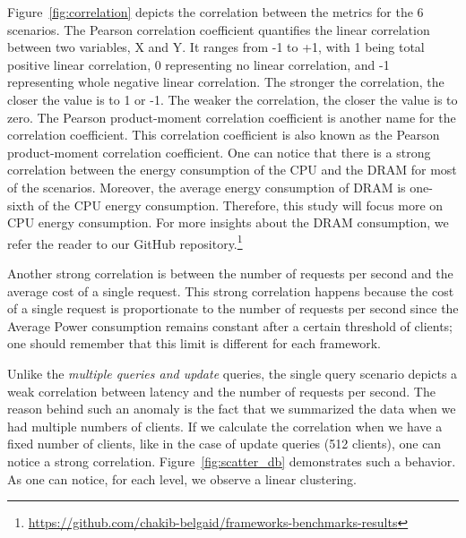 Figure~\ref{fig:correlation} depicts the correlation between the metrics for the 6 scenarios.
The Pearson correlation coefficient quantifies the linear correlation between two variables, X and Y.
It ranges from -1 to +1, with 1 being total positive linear correlation, 0 representing no linear correlation, and -1 representing whole negative linear correlation.
The stronger the correlation, the closer the value is to 1 or -1.
The weaker the correlation, the closer the value is to zero.
The Pearson product-moment correlation coefficient is another name for the correlation coefficient.
This correlation coefficient is also known as the Pearson product-moment correlation coefficient.
One can notice that there is a strong correlation between the energy consumption of the CPU and the DRAM for most of the scenarios.
Moreover, the average energy consumption of DRAM is one-sixth of the CPU energy consumption.
Therefore, this study will focus more on CPU energy consumption.
For more insights about the DRAM consumption, we refer the reader to our GitHub repository.\footnote{\url{https://github.com/chakib-belgaid/frameworks-benchmarks-results}}

Another strong correlation is between the number of requests per second and the average cost of a single request.
This strong correlation happens because the cost of a single request is proportionate to the number of requests per second since the Average Power consumption remains constant after a certain threshold of clients; one should remember that this limit is different for each framework.

Unlike the \emph{multiple queries and update} queries, the single query scenario depicts a weak correlation between latency and the number of requests per second.
The reason behind such an anomaly is the fact that we summarized the data when we had multiple numbers of clients.
If we calculate the correlation when we have a fixed number of clients, like in the case of update queries (512 clients), one can notice a strong correlation. Figure~\ref{fig:scatter_db} demonstrates such a behavior. As one can notice, for each level, we observe a linear clustering.

